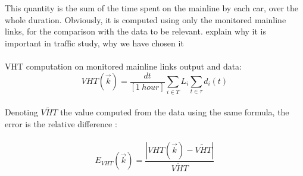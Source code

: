 This quantity is the sum of the time spent on the mainline by each car, over the whole duration.
Obviously, it is computed using only the monitored mainline links, for the comparison with the data to be relevant.
\color{red}explain why it is important in traffic study, why we have chosen it\color{black}\\ 
\\
VHT computation on monitored mainline links output and data:
\begin{equation*}
	 VHT(\vec{k})=\frac{dt}{[1\ hour]}\sum_{i\in{T}}L_{i}\sum_{t\in \tau}d_{i}(t)
\end{equation*}
\\
Denoting $\widetilde{VHT}$ the value computed from the data using the same formula, the error is the relative difference :\\
\\
\begin{equation*}
	E_{VHT}(\vec{k})=\frac{|VHT(\vec{k})-\widetilde{VHT}|}{\widetilde{VHT}}
\end{equation*}
